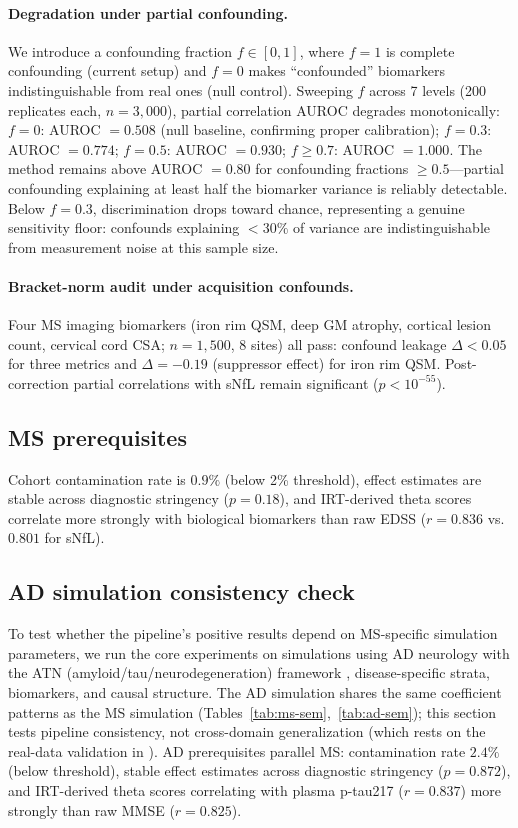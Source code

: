 \documentclass[11pt]{article}
\begin{document}
\paragraph{Degradation under partial confounding.}
We introduce a confounding fraction $f \in [0, 1]$, where $f = 1$ is complete confounding (current setup) and $f = 0$ makes ``confounded'' biomarkers indistinguishable from real ones (null control).
Sweeping $f$ across 7 levels (200 replicates each, $n = 3{,}000$), partial correlation AUROC degrades monotonically: $f = 0$: AUROC $= 0.508$ (null baseline, confirming proper calibration); $f = 0.3$: AUROC $= 0.774$; $f = 0.5$: AUROC $= 0.930$; $f \geq 0.7$: AUROC $= 1.000$.
The method remains above AUROC $= 0.80$ for confounding fractions $\geq 0.5$---partial confounding explaining at least half the biomarker variance is reliably detectable.
Below $f = 0.3$, discrimination drops toward chance, representing a genuine sensitivity floor: confounds explaining $< 30\%$ of variance are indistinguishable from measurement noise at this sample size.

\paragraph{Bracket-norm audit under acquisition confounds.}
Four MS imaging biomarkers (iron rim QSM, deep GM atrophy, cortical lesion count, cervical cord CSA; $n = 1{,}500$, 8 sites) all pass: confound leakage $\Delta < 0.05$ for three metrics and $\Delta = -0.19$ (suppressor effect) for iron rim QSM.
Post-correction partial correlations with sNfL remain significant ($p < 10^{-55}$).

\subsection{MS prerequisites}

Cohort contamination rate is $0.9\%$ (below 2\% threshold), effect estimates are stable across diagnostic stringency ($p = 0.18$), and IRT-derived theta scores correlate more strongly with biological biomarkers than raw EDSS ($r = 0.836$ vs.\ $0.801$ for sNfL).

\subsection{AD simulation consistency check}
\label{sec:ad}
\label{sec:res-ad}

To test whether the pipeline's positive results depend on MS-specific simulation parameters, we run the core experiments on simulations using AD neurology with the ATN (amyloid/tau/neurodegeneration) framework \citep{jack2018niaaa}, disease-specific strata, biomarkers, and causal structure. The AD simulation shares the same coefficient patterns as the MS simulation (Tables~\ref{tab:ms-sem},~\ref{tab:ad-sem}); this section tests pipeline consistency, not cross-domain generalization (which rests on the real-data validation in \citealp{tower2026sheaf}).
AD prerequisites parallel MS: contamination rate $2.4\%$ (below threshold), stable effect estimates across diagnostic stringency ($p = 0.872$), and IRT-derived theta scores correlating with plasma p-tau217 ($r = 0.837$) more strongly than raw MMSE ($r = 0.825$).
\end{document}
